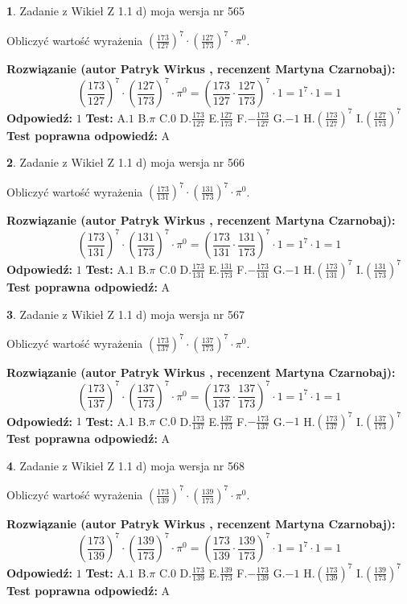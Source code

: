\documentclass[12pt, a4paper]{article}
\theoremstyle{definition} %
\newtheorem{zad}{}
\newcommand{\zadStart}[1]{\begin{zad}#1\newline}
\newcommand{\zadStop}{\end{zad}}
\newcommand{\rozwStart}[2]{\noindent \textbf{Rozwiązanie (autor #1 , recenzent #2): }\newline}
\newcommand{\rozwStop}{\newline}
\newcommand{\odpStart}{\noindent \textbf{Odpowiedź:}\newline}
\newcommand{\odpStop}{\newline}
\newcommand{\testStart}{\noindent \textbf{Test:}\newline}
\newcommand{\testStop}{\newline}
\newcommand{\kluczStart}{\noindent \textbf{Test poprawna odpowiedź:}\newline}
\newcommand{\kluczStop}{\newline}
\begin{document}
\zadStart{Zadanie z Wikieł Z 1.1 d) moja wersja nr 565}

Obliczyć wartość wyrażenia $(\frac{173}{127})^{7} \cdot (\frac{127}{173})^{7} \cdot \pi^{0}$.
\zadStop
\rozwStart{Patryk Wirkus}{Martyna Czarnobaj}
$$(\frac{173}{127})^{7} \cdot (\frac{127}{173})^{7} \cdot \pi^{0} = (\frac{173}{127} \cdot \frac{127}{173})^{7} \cdot 1 = 1^{7} \cdot 1 = 1$$
\rozwStop
\odpStart
$1$
\odpStop
\testStart
A.$1$ B.$\pi$ C.$0$ D.$\frac{173}{127}$ E.$\frac{127}{173}$
F.$-\frac{173}{127}$ G.$-1$
H.$(\frac{173}{127})^{7}$
I.$(\frac{127}{173})^{7}$
\testStop
\kluczStart
A
\kluczStop



\zadStart{Zadanie z Wikieł Z 1.1 d) moja wersja nr 566}

Obliczyć wartość wyrażenia $(\frac{173}{131})^{7} \cdot (\frac{131}{173})^{7} \cdot \pi^{0}$.
\zadStop
\rozwStart{Patryk Wirkus}{Martyna Czarnobaj}
$$(\frac{173}{131})^{7} \cdot (\frac{131}{173})^{7} \cdot \pi^{0} = (\frac{173}{131} \cdot \frac{131}{173})^{7} \cdot 1 = 1^{7} \cdot 1 = 1$$
\rozwStop
\odpStart
$1$
\odpStop
\testStart
A.$1$ B.$\pi$ C.$0$ D.$\frac{173}{131}$ E.$\frac{131}{173}$
F.$-\frac{173}{131}$ G.$-1$
H.$(\frac{173}{131})^{7}$
I.$(\frac{131}{173})^{7}$
\testStop
\kluczStart
A
\kluczStop



\zadStart{Zadanie z Wikieł Z 1.1 d) moja wersja nr 567}

Obliczyć wartość wyrażenia $(\frac{173}{137})^{7} \cdot (\frac{137}{173})^{7} \cdot \pi^{0}$.
\zadStop
\rozwStart{Patryk Wirkus}{Martyna Czarnobaj}
$$(\frac{173}{137})^{7} \cdot (\frac{137}{173})^{7} \cdot \pi^{0} = (\frac{173}{137} \cdot \frac{137}{173})^{7} \cdot 1 = 1^{7} \cdot 1 = 1$$
\rozwStop
\odpStart
$1$
\odpStop
\testStart
A.$1$ B.$\pi$ C.$0$ D.$\frac{173}{137}$ E.$\frac{137}{173}$
F.$-\frac{173}{137}$ G.$-1$
H.$(\frac{173}{137})^{7}$
I.$(\frac{137}{173})^{7}$
\testStop
\kluczStart
A
\kluczStop



\zadStart{Zadanie z Wikieł Z 1.1 d) moja wersja nr 568}

Obliczyć wartość wyrażenia $(\frac{173}{139})^{7} \cdot (\frac{139}{173})^{7} \cdot \pi^{0}$.
\zadStop
\rozwStart{Patryk Wirkus}{Martyna Czarnobaj}
$$(\frac{173}{139})^{7} \cdot (\frac{139}{173})^{7} \cdot \pi^{0} = (\frac{173}{139} \cdot \frac{139}{173})^{7} \cdot 1 = 1^{7} \cdot 1 = 1$$
\rozwStop
\odpStart
$1$
\odpStop
\testStart
A.$1$ B.$\pi$ C.$0$ D.$\frac{173}{139}$ E.$\frac{139}{173}$
F.$-\frac{173}{139}$ G.$-1$
H.$(\frac{173}{139})^{7}$
I.$(\frac{139}{173})^{7}$
\testStop
\kluczStart
A
\kluczStop
\end{document}
